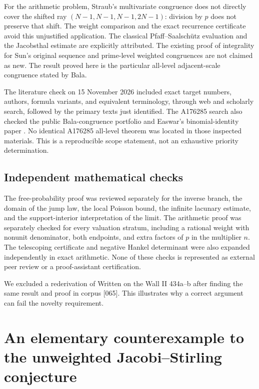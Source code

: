 \documentclass[11pt,a4paper]{article}
\numberwithin{equation}{section}
\begin{document}
For the arithmetic problem, Straub's multivariate congruence
\cite{Straub} does not directly cover the shifted ray
$(N-1,N-1,N-1,2N-1)$: division by $p$ does not preserve that shift.
The weight comparison and the exact recurrence certificate avoid this
unjustified application. The classical Pfaff--Saalsch\"utz evaluation
and the Jacobsthal estimate are explicitly attributed.
The existing proof of integrality for Sun's original sequence and
prime-level weighted congruences \cite{HP} are not claimed as new.
The result proved here is the particular all-level adjacent-scale
congruence stated by Bala.

The literature check on 15 November 2026 included exact target numbers,
authors, formula variants, and equivalent terminology, through web and
scholarly search, followed by the primary texts just identified.
The A176285 search also checked the public Bala-congruence portfolio
\cite{Bajaj} and Easwar's binomial-identity paper \cite{Easwar}.
No identical A176285 all-level theorem was located in those inspected
materials. This is a reproducible scope statement, not an exhaustive
priority determination.

\subsection{Independent mathematical checks}
The free-probability proof was reviewed separately for the inverse
branch, the domain of the jump law, the local Poisson bound, the
infinite lacunary estimate, and the support-interior interpretation of
the limit. The arithmetic proof was separately checked for every
valuation stratum, including a rational weight with nonunit denominator,
both endpoints, and extra factors of $p$ in the multiplier $n$.
The telescoping certificate and negative Hankel determinant were also
expanded independently in exact arithmetic. None of these checks is
represented as external peer review or a proof-assistant certification.

We excluded a rederivation of Written on the Wall II 434a--b after
finding the same result and proof in corpus [065]. This illustrates
why a correct argument can fail the novelty requirement.

\appendix
\section{An elementary counterexample to the unweighted Jacobi--Stirling conjecture}
\label{sec:jacobi-stirling-counterexample}
\end{document}
